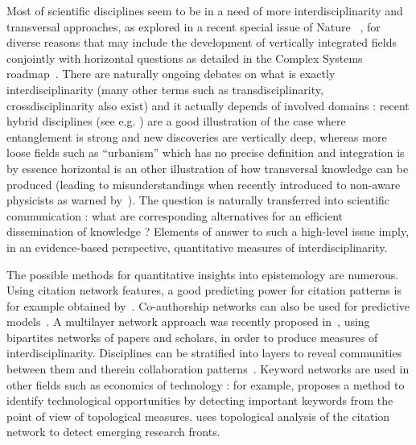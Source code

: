 Most of scientific disciplines seem to be in a need of more interdisciplinarity and transversal approaches, as explored in a recent special issue of Nature~\cite{} %
, for diverse reasons that may include the development of vertically integrated fields conjointly with horizontal questions as detailed in the Complex Systems roadmap~\cite{2009arXiv0907.2221B}. There are naturally ongoing debates on what is exactly interdisciplinarity (many other terms such as transdisciplinarity, crossdisciplinarity also exist) and it actually depends of involved domains : recent hybrid disciplines (see e.g. )%
are a good illustration of the case where entanglement is strong and new discoveries are vertically deep, whereas %
more loose fields such as ``urbanism'' which has no precise definition and integration is by essence horizontal is an other illustration of how transversal knowledge can be produced (leading to misunderstandings when recently introduced to non-aware physicists as warned by~\cite{dupuy2015sciences}).
The question is naturally transferred into scientific communication : what are corresponding alternatives for an efficient dissemination of knowledge ? Elements of answer to such a high-level issue imply, in an evidence-based perspective, quantitative measures of interdisciplinarity.




The possible methods for quantitative insights into epistemology are numerous. %
 Using citation network features, a good predicting power for citation patterns is for example obtained by~\cite{2013arXiv1310.8220N}. Co-authorship networks can also be used for predictive models~\cite{2014arXiv1402.7268S}. A multilayer network approach was recently proposed in~\cite{2016arXiv160106075O}, using bipartites networks of papers and scholars, in order to produce measures of interdisciplinarity. Disciplines can be stratified into layers to reveal communities between them and therein collaboration patterns~\cite{2015arXiv150601280B}. Keyword networks are used in other fields such as economics of technology : for example, \cite{choi2014patent} proposes a method to identify technological opportunities by detecting important keywords from the point of view of topological measures. \cite{shibata2008detecting} uses topological analysis of the citation network to detect emerging research fronts.


